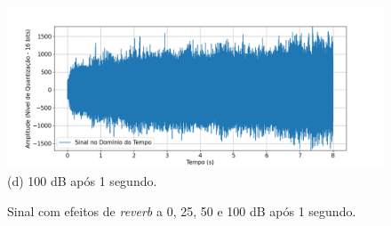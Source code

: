 \begin{figure}[htpb]
    \begin{minipage}[b]{0.7\textwidth}
        \centering
        \includegraphics[width=\textwidth]{figuras/fig73.png}
        \vspace{0.3cm} %
        (d) 100 dB após 1 segundo.
    \end{minipage}

    \caption{Sinal com efeitos de \textit{reverb} a 0, 25, 50 e 100 dB após 1 segundo.}
    \label{fig70}
\end{figure}








